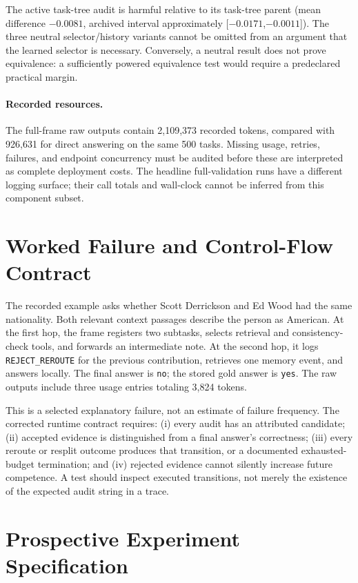 \documentclass[sigconf,anonymous]{aamas}
\begin{document}
The active task-tree audit is harmful relative to its task-tree parent (mean difference $-0.0081$, archived interval approximately [$-0.0171$,$-0.0011$]). The three neutral selector/history variants cannot be omitted from an argument that the learned selector is necessary. Conversely, a neutral result does not prove equivalence: a sufficiently powered equivalence test would require a predeclared practical margin.

\paragraph{Recorded resources.}
The full-frame raw outputs contain 2,109,373 recorded tokens, compared with 926,631 for direct answering on the same 500 tasks. Missing usage, retries, failures, and endpoint concurrency must be audited before these are interpreted as complete deployment costs. The headline full-validation runs have a different logging surface; their call totals and wall-clock cannot be inferred from this component subset.

\section{Worked Failure and Control-Flow Contract}

The recorded example asks whether Scott Derrickson and Ed Wood had the same nationality. Both relevant context passages describe the person as American. At the first hop, the frame registers two subtasks, selects retrieval and consistency-check tools, and forwards an intermediate note. At the second hop, it logs \texttt{REJECT\_REROUTE} for the previous contribution, retrieves one memory event, and answers locally. The final answer is \texttt{no}; the stored gold answer is \texttt{yes}. The raw outputs include three usage entries totaling 3,824 tokens.

This is a selected explanatory failure, not an estimate of failure frequency. The corrected runtime contract requires: (i) every audit has an attributed candidate; (ii) accepted evidence is distinguished from a final answer's correctness; (iii) every reroute or resplit outcome produces that transition, or a documented exhausted-budget termination; and (iv) rejected evidence cannot silently increase future competence. A test should inspect executed transitions, not merely the existence of the expected audit string in a trace.

\section{Prospective Experiment Specification}
\end{document}
